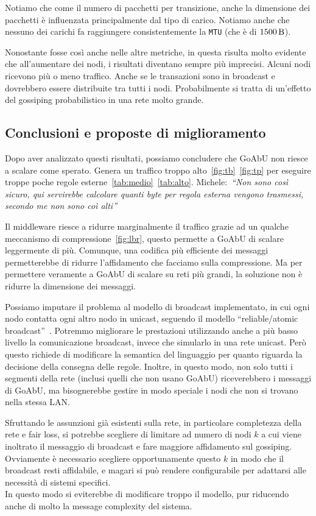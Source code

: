 \documentclass[12pt, a4paper]{article}
\newcommand{\michele}[1]{{\color{red}Michele:~}{\itshape``{#1}''}}
\begin{document}
Notiamo che come il numero di pacchetti per transizione, anche la dimensione dei pacchetti è influenzata principalmente dal tipo di carico.
Notiamo anche che nessuno dei carichi fa raggiungere consistentemente la \lstinline{MTU} (che è di $\qty{1500}{\byte}$).

Nonostante fosse così anche nelle altre metriche, in questa risulta molto evidente che all'aumentare dei nodi, i risultati diventano sempre più imprecisi.
Alcuni nodi ricevono più o meno traffico. Anche se le transazioni sono in broadcast e dovrebbero essere distribuite tra tutti i nodi.
Probabilmente si tratta di un'effetto del gossiping probabilistico in una rete molto grande.

\subsection{Conclusioni e proposte di miglioramento}

Dopo aver analizzato questi risultati, possiamo concludere che GoAbU non riesce a scalare come sperato. Genera un traffico troppo alto~\ref{fig:tb}~\ref{fig:tp} per eseguire troppe poche regole esterne~\ref{tab:medio}~\ref{tab:alto}. \michele{Non sono così sicuro, qui servirebbe calcolare quanti byte per regola esterna vengono trasmessi, secondo me non sono coì alti}

Il middleware riesce a ridurre marginalmente il traffico grazie ad un qualche meccanismo di compressione~\ref{fig:lbr}, questo permette a GoAbU di scalare leggermente di più. Comunque, una codifica più efficiente dei messaggi permetterebbe di ridurre l'affidamento che facciamo sulla compressione. Ma per permettere veramente a GoAbU di scalare su reti più grandi, la soluzione non è ridurre la dimensione dei messaggi.

Possiamo imputare il problema al modello di broadcast implementato, in cui ogni nodo contatta ogni altro nodo in unicast, seguendo il modello ``reliable/atomic broadcast''~\cite{joseph1989reliable}.
Potremmo migliorare le prestazioni utilizzando anche a più basso livello la comunicazione broadcast, invece che simularlo in una rete unicast. Però questo richiede di modificare la semantica del linguaggio per quanto riguarda la decisione della consegna delle regole.
Inoltre, in questo modo, non solo tutti i segmenti della rete (inclusi quelli che non usano GoAbU) riceverebbero i messaggi di GoAbU, ma bisognerebbe gestire in modo speciale i nodi che non si trovano nella stessa LAN.

Sfruttando le assunzioni già esistenti sulla rete, in particolare completezza della rete e fair loss, si potrebbe scegliere di limitare ad numero di nodi $k$ a cui viene inoltrato il messaggio di broadcast e fare maggiore affidamento sul gossiping.
Ovviamente è necessario scegliere opportunamente questo $k$ in modo che il broadcast resti affidabile, e magari si può rendere configurabile per adattarsi alle necessità di sistemi specifici.\\
In questo modo si eviterebbe di modificare troppo il modello, pur riducendo anche di molto la message complexity del sistema.
\end{document}
